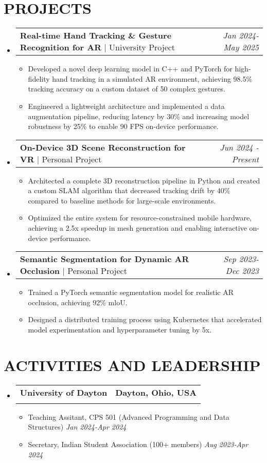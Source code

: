 \documentclass[letterpaper,11pt]{article}
\makeatletter
\newcommand{\resumeItem}[1]{
  \item\small{
    {#1 \vspace{-2pt}}
  }
}
\newcommand{\resumeSubheading}[4]{
  \vspace{-2pt}\item
    \begin{tabular*}{0.97\textwidth}[t]{l@{\extracolsep{\fill}}r}
      \textbf{#1} & #2 \\
      \textit{\small#3} & \textit{\small #4} \\
    \end{tabular*}\vspace{-7pt}
}
\newcommand{\resumeProjectHeading}[2]{
    \item
    \begin{tabular*}{0.97\textwidth}{l@{\extracolsep{\fill}}r}
      \small#1 & #2 \\
    \end{tabular*}\vspace{-7pt}
}
\newcommand{\resumeSubHeadingListStart}{\begin{itemize}[leftmargin=0.15in, label={}]}
\newcommand{\resumeSubHeadingListEnd}{\end{itemize}}
\newcommand{\resumeItemListStart}{\begin{itemize}}
\newcommand{\resumeItemListEnd}{\end{itemize}\vspace{-5pt}}
\makeatother
\begin{document}
\section{{\fontsize{9pt}{20pt}\selectfont \textbf{PROJECTS}}}
\resumeSubHeadingListStart
\resumeProjectHeading
{\textbf{Real-time Hand Tracking \& Gesture Recognition for AR} | University Project}{\textit{Jan 2024-May 2025}}
\resumeItemListStart
\resumeItem{Developed a novel deep learning model in C++ and PyTorch for high-fidelity hand tracking in a simulated AR environment, achieving 98.5\% tracking accuracy on a custom dataset of 50 complex gestures. }
\resumeItem{Engineered a lightweight architecture and implemented a data augmentation pipeline, reducing latency by 30\% and increasing model robustness by 25\% to enable 90 FPS on-device performance. }
\resumeItemListEnd
\vspace{-6pt}
\resumeProjectHeading
{\textbf{On-Device 3D Scene Reconstruction for VR} | Personal Project}{\textit{Jun 2024 - Present}}
\resumeItemListStart
\resumeItem{Architected a complete 3D reconstruction pipeline in Python and created a custom SLAM algorithm that decreased tracking drift by 40\% compared to baseline methods for large-scale environments. }
\resumeItem{Optimized the entire system for resource-constrained mobile hardware, achieving a 2.5x speedup in mesh generation and enabling interactive on-device performance. }
\resumeItemListEnd
\vspace{-6pt}
\resumeProjectHeading
{\textbf{Semantic Segmentation for Dynamic AR Occlusion} | Personal Project}{\textit{Sep 2023-Dec 2023}}
\resumeItemListStart
\resumeItem{Trained a PyTorch semantic segmentation model for realistic AR occlusion, achieving 92\% mloU. }
\resumeItem{Designed a distributed training process using Kubernetes that accelerated model experimentation and hyperparameter tuning by 5x. }
\resumeItemListEnd
\resumeSubHeadingListEnd
\vspace{-17pt}
\section{{\fontsize{9pt}{20pt}\selectfont \textbf{ACTIVITIES AND LEADERSHIP}}}
\resumeSubHeadingListStart
  \resumeSubheading{University of Dayton}{\textbf{Dayton, Ohio, USA}}{}{}
  \vspace{-17pt}
  \resumeItemListStart
    \resumeItem{{Teaching Assitant, CPS 501 (Advanced Programming and Data Structures)} \hfill \textit{Jan 2024-Apr 2024}}
    \resumeItem{{Secretary, Indian Student Association (100+ members)} \hfill \textit{Aug 2023-Apr 2024}}
  \resumeItemListEnd
\resumeSubHeadingListEnd
\vspace{-18pt}
\end{document}
